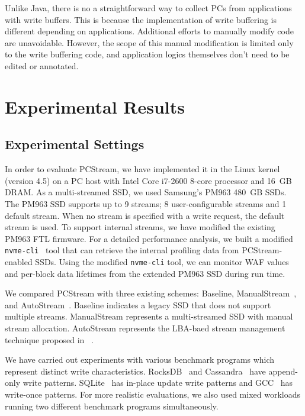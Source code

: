 Unlike Java, there is no a straightforward way to collect PCs from applications
with write buffers. This is because the implementation of write buffering is
different depending on applications. Additional efforts to manually modify code
are unavoidable. However, the scope of this manual modification is limited only
to the write buffering code, and application logics themselves don't need to be
edited or annotated.


\section{Experimental Results}
\subsection{Experimental Settings}
In order to evaluate \textsf{\small PCStream}, we have implemented it in the
Linux kernel (version 4.5) on a PC host with Intel Core i7-2600 8-core
processor and 16~GB DRAM.  As a multi-streamed SSD, we used Samsung's PM963
480~GB SSDs.  The PM963 SSD supports up to 9 streams; 8 user-configurable
streams and 1 default stream.  When no stream is specified with a write
request, the default stream is used.  To support internal streams, we have
modified the existing PM963 FTL firmware.  For a detailed performance analysis,
we built a modified {\tt nvme-cli}~\cite{nvmecli} tool that can retrieve the internal
profiling data from \textsf{\small PCStream}-enabled SSDs.  
Using the modified {\tt nvme-cli} tool, we can monitor 
WAF values and per-block data lifetimes from the extended PM963 SSD during run time.

We compared \textsf{\small PCStream} with three existing schemes:
\textsf{\small Baseline}, \textsf{\small ManualStream}~\cite{MultiStream}, and
\textsf{\small AutoStream}~\cite{AutoStream}.  \textsf{\small Baseline}
indicates a legacy SSD that does not support multiple streams. \textsf{\small
ManualStream} represents a multi-streamed SSD with manual stream allocation.
\textsf{\small AutoStream} represents the LBA-baed stream management technique
proposed in ~\cite{AutoStream}. 


We have carried out experiments with various benchmark programs
which represent distinct write characteristics.
RocksDB~\cite{RocksDB} and Cassandra~\cite{Cassandra} have
append-only write patterns. SQLite~\cite{SQLite} has in-place update write patterns
and GCC~\cite{GCC} has write-once patterns.  
For more realistic evaluations, we also used mixed workloads running two 
different benchmark programs simultaneously.

